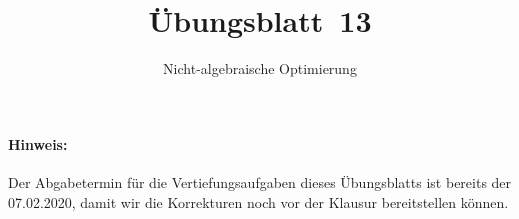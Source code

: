 \usetikzlibrary{arrows, calc}

\title{Übungsblatt~13}
\subtitle{Nicht-algebraische Optimierung}
\maketitle



\paragraph{Hinweis:} Der Abgabetermin für die Vertiefungsaufgaben dieses Übungsblatts
ist bereits der 07.02.2020,
damit wir die Korrekturen noch vor der Klausur bereitstellen können.






